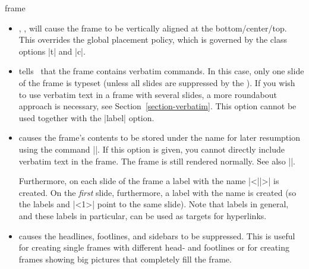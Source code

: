 \begin{environment}{{frame}%
    }
\begin{frame}[<+->][plain]
\begin{frame}[plain]
\begin{itemize}
    \example
\begin{verbatim}
\begin{frame}[allowframebreaks]
  \frametitle{References}

  \begin{thebibliography}{XX}

  \bibitem...
  \bibitem...
    ...
  \bibitem...
  \end{thebibliography}
\end{frame}
\end{verbatim}
    \example
\begin{verbatim}
\begin{frame}[allowframebreaks,allowdisplaybreaks]
  \frametitle{A Long Equation}

  \begin{align}
    \zeta(2) &= 1 + 1/4 + 1/9 + \cdots \\
    &= ... \\
    ...
    &= \pi^2/6.
  \end{align}
\end{frame}
\end{verbatim}
  \item
    , ,  will cause the frame
    to be vertically aligned at the bottom/center/top. This overrides
    the global placement policy, which is governed by the class
    options |t| and |c|.
  \item
     tells \beamer\ that the frame
    contains verbatim commands. In this case, only one slide of
    the frame is typeset (unless all slides are suppressed by the
    ). If you wish to use verbatim text in
    a frame with several slides, a more roundabout approach is
    necessary, see Section~\ref{section-verbatim}. This option cannot
    be used together with the |label| option.
    
  \item
     causes the frame's contents to
    be stored under the name  for later resumption using
    the command |\againframe|. If this option is given, you cannot
    directly include verbatim text in the frame. The frame is still rendered
    normally. See also |\againframe|.

    Furthermore, on each slide of the frame a label with the name
    |<||>| is created. On the
    \emph{first} slide, furthermore, a label with the name 
    is created (so the labels  and |<1>| point
    to the same slide). Note that labels in general, and these labels
    in particular, can be used as targets for hyperlinks.
  \item
     causes  the headlines, footlines,
    and sidebars to be suppressed. This is useful for creating single
    frames with different head- and footlines or for creating frames
    showing big pictures that completely fill the frame.


\end{itemize}
\end{frame}
\end{frame}
\end{environment}
